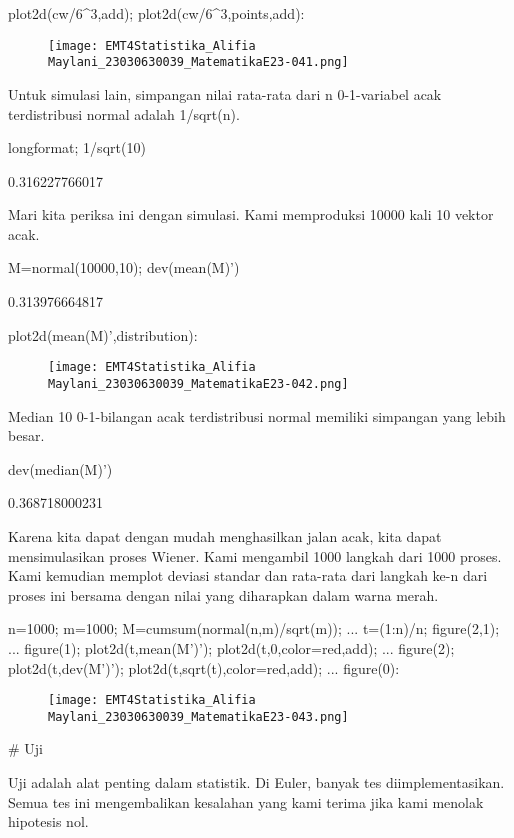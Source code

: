 \documentclass{article}
\begin{document}
\>plot2d(cw/6^3,\>add); plot2d(cw/6^3,\>points,\>add):


\begin{figure}
    \centering
    \texttt{[image: EMT4Statistika\_Alifia Maylani\_23030630039\_MatematikaE23-041.png]}
    \caption{}
    \label{fig:enter-label}
\end{figure}

Untuk simulasi lain, simpangan nilai rata-rata dari n 0-1-variabel
acak terdistribusi normal adalah 1/sqrt(n).


\>longformat; 1/sqrt(10)


    0.316227766017

Mari kita periksa ini dengan simulasi. Kami memproduksi 10000 kali 10
vektor acak.


\>M=normal(10000,10); dev(mean(M)')


    0.313976664817

\>plot2d(mean(M)',\>distribution):


\begin{figure}
    \centering
    \texttt{[image: EMT4Statistika\_Alifia Maylani\_23030630039\_MatematikaE23-042.png]}
    \caption{}
    \label{fig:enter-label}
\end{figure}

Median 10 0-1-bilangan acak terdistribusi normal memiliki simpangan
yang lebih besar.


\>dev(median(M)')


    0.368718000231

Karena kita dapat dengan mudah menghasilkan jalan acak, kita dapat
mensimulasikan proses Wiener. Kami mengambil 1000 langkah dari 1000
proses. Kami kemudian memplot deviasi standar dan rata-rata dari
langkah ke-n dari proses ini bersama dengan nilai yang diharapkan
dalam warna merah.


\>n=1000; m=1000; M=cumsum(normal(n,m)/sqrt(m)); ...  
\>   t=(1:n)/n; figure(2,1); ...  
\>   figure(1); plot2d(t,mean(M')'); plot2d(t,0,color=red,\>add); ...  
\>   figure(2); plot2d(t,dev(M')'); plot2d(t,sqrt(t),color=red,\>add); ...  
\>   figure(0):


\begin{figure}
    \centering
    \texttt{[image: EMT4Statistika\_Alifia Maylani\_23030630039\_MatematikaE23-043.png]}
    \caption{}
    \label{fig:enter-label}
\end{figure}

# Uji

Uji adalah alat penting dalam statistik. Di Euler, banyak tes
diimplementasikan. Semua tes ini mengembalikan kesalahan yang kami
terima jika kami menolak hipotesis nol.
\end{document}
